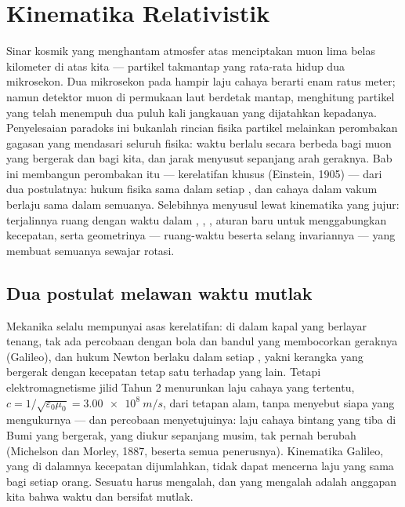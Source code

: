 \chapter{Kinematika Relativistik}\label{ch:b3:relativistic-kinematics}

Sinar kosmik yang menghantam atmosfer atas menciptakan muon lima belas
kilometer di atas kita --- partikel takmantap yang rata-rata hidup dua
mikrosekon. Dua mikrosekon pada hampir laju cahaya berarti enam ratus
meter; namun detektor muon di permukaan laut berdetak mantap, menghitung
partikel yang telah menempuh dua puluh kali jangkauan yang dijatahkan
kepadanya. Penyelesaian paradoks ini bukanlah rincian fisika partikel
melainkan perombakan gagasan yang mendasari seluruh fisika: waktu
berlalu secara berbeda bagi muon yang bergerak dan bagi kita, dan jarak
menyusut sepanjang arah geraknya. Bab ini membangun perombakan itu ---
kerelatifan khusus (Einstein, 1905) --- dari dua postulatnya: hukum
fisika sama dalam setiap , dan cahaya dalam vakum
berlaju sama dalam semuanya. Selebihnya menyusul lewat kinematika yang
jujur: terjalinnya ruang dengan waktu dalam ,
, , aturan baru untuk menggabungkan
kecepatan, serta geometrinya --- ruang-waktu beserta selang
invariannya --- yang membuat semuanya sewajar rotasi.

\section{Dua postulat melawan waktu mutlak}

\begin{remark}\label{rem:b3:relativistic-kinematics:conflict}
Mekanika selalu mempunyai asas kerelatifan: di dalam kapal yang berlayar
tenang, tak ada percobaan dengan bola dan bandul yang membocorkan
geraknya (Galileo), dan hukum Newton berlaku dalam setiap \emph{}, yakni kerangka yang bergerak dengan kecepatan tetap satu
terhadap yang lain. Tetapi elektromagnetisme jilid Tahun 2 menurunkan
laju cahaya yang tertentu, $c = 1/\sqrt{\varepsilon_0\mu_0} =
\qty{3.00e8}{m/s}$, dari tetapan alam, tanpa menyebut siapa yang
mengukurnya --- dan percobaan menyetujuinya: laju cahaya bintang yang
tiba di Bumi yang bergerak, yang diukur sepanjang musim, tak pernah
berubah (Michelson dan Morley, 1887, beserta semua penerusnya).
Kinematika Galileo, yang di dalamnya kecepatan dijumlahkan, tidak dapat
mencerna laju yang sama bagi setiap orang. Sesuatu harus mengalah, dan
yang mengalah adalah anggapan kita bahwa waktu dan  bersifat
mutlak.
\end{remark}

